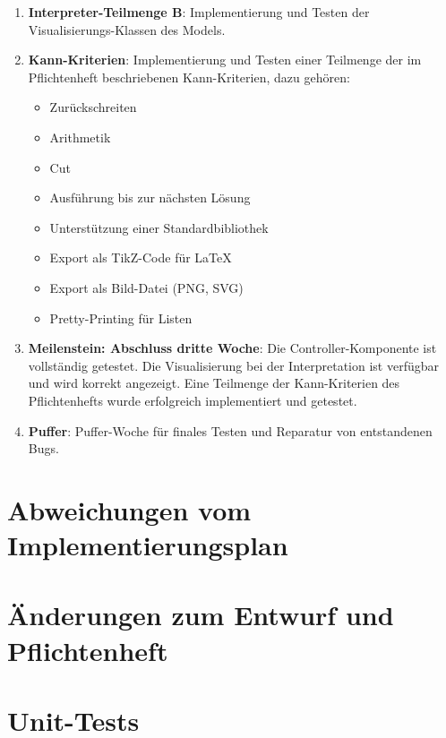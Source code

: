 \documentclass[parskip=full,11pt,twoside]{scrartcl}
\begin{document}
\begin{enumerate}
	\item \textbf{Interpreter-Teilmenge B}: Implementierung und Testen der Visualisierungs-Klassen des Models.
	
	\item \textbf{Kann-Kriterien}: Implementierung und Testen einer Teilmenge der im Pflichtenheft beschriebenen Kann-Kriterien, dazu gehören:
	\begin{multicols}{2}
		\begin{itemize}
			\item Zurückschreiten
			\item Arithmetik
			\item Cut
			\item Ausführung bis zur nächsten Lösung
			\item Unterstützung einer Standardbibliothek
			\item Export als TikZ-Code für LaTeX
			\item Export als Bild-Datei (PNG, SVG)
			\item Pretty-Printing für Listen
		\end{itemize}
	\end{multicols}
	
	\item \textbf{Meilenstein: Abschluss dritte Woche}: Die Controller-Komponente ist vollständig getestet. Die Visualisierung bei der Interpretation ist verfügbar und wird korrekt angezeigt. Eine Teilmenge der Kann-Kriterien des Pflichtenhefts wurde erfolgreich implementiert und getestet.
	
	\item \textbf{Puffer}: Puffer-Woche für finales Testen und Reparatur von entstandenen Bugs.
\end{enumerate}

\section{Abweichungen vom Implementierungsplan}

\section{Änderungen zum Entwurf und Pflichtenheft}

\section{Unit-Tests}
\end{document}
